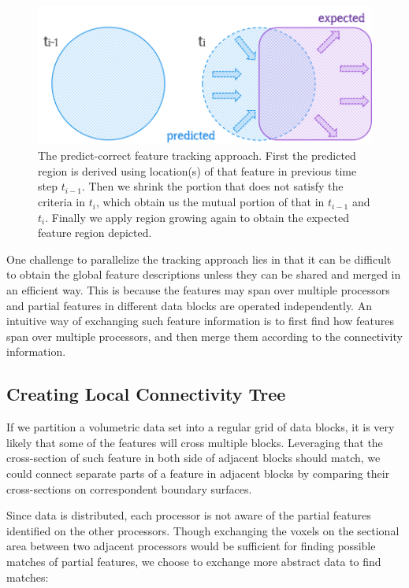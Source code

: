 \documentclass[10pt, conference, compsocconf]{IEEEtran}
\begin{document}
\begin{figure}[ht]
	\centering
	\includegraphics[width=0.9\linewidth]{predict_correct.png}
	\caption{The predict-correct feature tracking approach. First the predicted region is derived using location(s) of that feature in previous time step $t_{i-1}$. Then we shrink the portion that does not satisfy the criteria in $t_i$, which obtain us the mutual portion of that in $t_{i-1}$ and $t_i$. Finally we apply region growing again to obtain the expected feature region depicted.}
	\label{fig:predict-correct}
\end{figure}

One challenge to parallelize the tracking approach lies in that it can be difficult to obtain the global feature descriptions unless they can be shared and merged in an efficient way. This is because the features may span over multiple processors and partial features in different data blocks are operated independently. An intuitive way of exchanging such feature information is to first find how features span over multiple processors, and then merge them according to the connectivity information.

\subsection{Creating Local Connectivity Tree}

If we partition a volumetric data set into a regular grid of data blocks, it is very likely that some of the features will cross multiple blocks. Leveraging that the cross-section of such feature in both side of adjacent blocks should match, we could connect separate parts of a feature in adjacent blocks by comparing their cross-sections on correspondent boundary surfaces.

Since data is distributed, each processor is not aware of the partial features identified on the other processors. Though exchanging the voxels on the sectional area between two adjacent processors would be sufficient for finding possible matches of partial features, we choose to exchange more abstract data to find matches:
\end{document}
